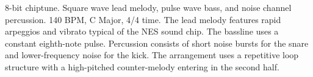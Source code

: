 

\begin{notes}
\end{notes}
\begin{style}
8-bit chiptune. %
Square wave lead melody, pulse wave bass, and noise channel percussion. %
140 BPM, C Major, 4/4 time. %
The lead melody features rapid arpeggios and vibrato typical of the NES sound chip. %
The bassline uses a constant eighth-note pulse. %
Percussion consists of short noise bursts for the snare and lower-frequency noise for the kick. %
The arrangement uses a repetitive loop structure with a high-pitched counter-melody entering in the second half.
\end{style}
\begin{lyrics}


\\
\\

\\

\end{lyrics}


